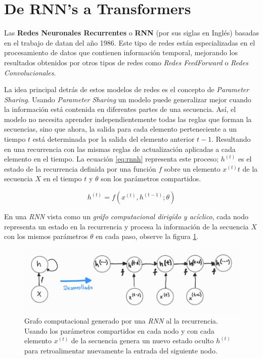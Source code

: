 \section{De RNN's a Transformers}

Las \textbf{Redes Neuronales Recurrentes} o \textbf{RNN} (por sus siglas en Inglés) basadas en el
trabajo de \citeauthor{Rumelhart} datan del año 1986. Este tipo de redes están especializadas
en el procesamiento de datos que contienen información temporal, mejorando los resultados obtenidos
por otros tipos de redes como \textit{Redes FeedForward} o \textit{Redes Convolucionales}.

La idea principal detrás de estos modelos de redes es el concepto de \textit{Parameter Sharing}.
Usando \textit{Parameter Sharing} un modelo puede generalizar mejor cuando la información
está contenida en diferentes partes de una secuencia. Así, el modelo no necesita aprender
independientemente todas las reglas que forman la secuencias, sino que ahora, la salida para cada
elemento perteneciente a un tiempo $t$ está determinada por la salida del elemento anterior $t-1$.
Resultando en una recurrencia con las mismas reglas de actualización aplicadas a cada elemento en el tiempo.
La ecuación \ref{eq:rnnh} representa este proceso; $h^{(t)}$ es el estado de la recurrencia definida
por una función $f$ sobre un elemento $x^{(t)}t$ de la secuencia $X$ en el tiempo $t$ y $\theta$ son
los parámetros compartidos.

\begin{equation}
    h^{(t)} = f(x^{(t)}, h^{(t-1)}; \theta)
    \label{eq:rnnh}
\end{equation}

En una \textit{RNN} vista como un \textit{gráfo computacional dirigído y acíclico}, cada nodo
representa un estado en la recurrencia y procesa la información de la secuencia $X$ con los mismos
parámetros $\theta$ en cada paso, observe la figura \ref{fig:rnn_cg}.

\begin{figure}[!ht]
\centering
\includegraphics[width=.8\textwidth]{Chapters/2. Transformer/Figures/rnn/rnn_cgraph.png}
\caption[RNN - Grafo Computacional]{Grafo computacional generado por una \textit{RNN} al
         la recurrencia. Usando los parámetros compartidos en cada nodo
        y con cada elemento $x^{(t)}$ de la secuencia genera un nuevo estado oculto $h^{(t)}$
        para retroalimentar nuevamente la entrada del siguiente nodo.}
\label{fig:rnn_cg}
\end{figure}

